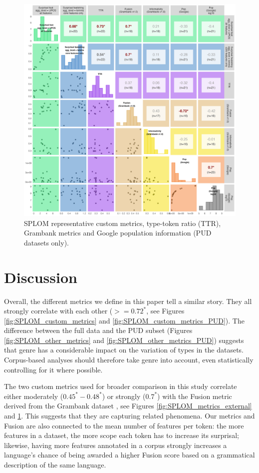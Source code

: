 \documentclass[USenglish]{article}
\begin{document}
\begin{figure}
    \centering
        \includegraphics[width=1\linewidth]{latex/graphics/SPLOM_metrics_external_PUD.png}
    \caption{SPLOM representative custom metrics, type-token ratio (TTR), Grambank metrics and Google population information  (PUD datasets only).}
    \label{fig:SPLOM_metrics_external_PUD}
\end{figure}

\FloatBarrier
\section{Discussion}
Overall, the different metrics we define in this paper tell a similar story. 
They all strongly correlate with each other ($>=0.72^*$, see Figures  \ref{fig:SPLOM_custom_metrics} and \ref{fig:SPLOM_custom_metrics_PUD}). 
The difference between the full data and the PUD subset (Figures  \ref{fig:SPLOM_other_metrics} and \ref{fig:SPLOM_other_metrics_PUD}) suggests that genre has a considerable impact on the variation of types in the datasets. 
Corpus-based analyses should therefore take genre into account, even statistically controlling for it where possible.

The two custom metrics used for broader comparison in this study correlate either moderately ($0.45^*-0.48^*$) or strongly ($0.7^*$) with the Fusion metric derived from the Grambank dataset \citep{grambank_release, shcherbakova2023societies}, see Figures \ref{fig:SPLOM_metrics_external} and \ref{fig:SPLOM_metrics_external_PUD}. 
This suggests that they are capturing related phenomena. 
Our metrics and Fusion are also connected to the mean number of features per token: the more features in a dataset, the more scope each token has to increase its surprisal; likewise, having more features annotated in a corpus strongly increases a language's chance of being awarded a higher Fusion score based on a grammatical description of the same language.
\end{document}
